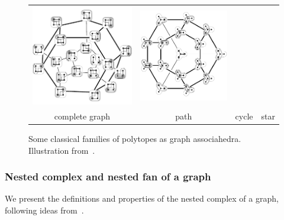 \documentclass{amsart}
\theoremstyle{definition}
\begin{document}
\begin{figure}[t]
\begin{adjustbox}{center}
\begin{tabular}{c@{\;}c@{\;}c@{\;}c}
			\includegraphics[scale=.6]{cyclohedronTubings} &
			\includegraphics[scale=.6]{stellohedronTubings} \\[.1cm]
			complete graph &
			path &
			cycle &
			star
		\end{tabular}
	\end{adjustbox}
	\caption{Some classical families of polytopes as graph associahedra. Illustration from~\cite{MannevillePilaud-compatibilityFans}.}
	\label{fig:specialGraphAssociahedra}
\end{figure}


\subsubsection{Nested complex and nested fan of a graph}

We present the definitions and properties of the nested complex of a graph, following ideas from~\cite{CarrDevadoss, Postnikov, FeichtnerSturmfels, Zelevinsky}.
\end{document}
